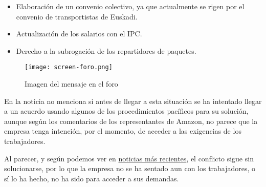 \begin{enumerate}
    \begin{itemize}
        \item Elaboración de un convenio colectivo, ya que actualmente se rigen por el convenio de transportistas de Euskadi.
        \item Actualización de los salarios con el IPC.
        \item Derecho a la subrogación de los repartidores de paquetes.
    \end{itemize}

     \begin{figure}[H]
        \centering
        \texttt{[image: screen-foro.png]}
        \caption{Imagen del mensaje en el foro}
    \end{figure}

    En la noticia no menciona si antes de llegar a esta situación se ha intentado llegar a un acuerdo usando algunos de los procedimientos pacíficos para su solución, aunque según los comentarios de los representantes de Amazon, no parece que la empresa tenga intención, por el momento, de acceder a las exigencias de los trabajadores.

    Al parecer, y según podemos ver en \href{https://www.eldiario.es/euskadi/exito-huelga-amazon-bizkaia-60-000-paquetes-bloqueados-puertas-navidad_1_9820882.html}{noticias más recientes}, el conflicto sigue sin solucionarse, por lo que la empresa no se ha sentado aun con los trabajadores, o sí lo ha hecho, no ha sido para acceder a sus demandas.
\end{enumerate}










\newpage



